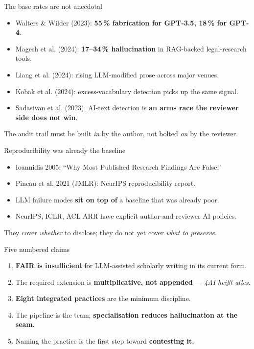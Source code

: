 \documentclass[aspectratio=169,11pt]{beamer}
\begin{document}
\begin{frame}{The base rates are not anecdotal}
  \begin{itemize}
    \item Walters \& Wilder (2023): \textbf{55\,\% fabrication for GPT-3.5, 18\,\% for GPT-4}.
    \item Magesh et al. (2024): \textbf{17--34\,\% hallucination} in RAG-backed legal-research tools.
    \item Liang et al. (2024): rising LLM-modified prose across major venues.
    \item Kobak et al. (2024): excess-vocabulary detection picks up the same signal.
    \item Sadasivan et al. (2023): AI-text detection is \textbf{an arms race the reviewer side does not win}.
  \end{itemize}

  \vspace{0.4em}
  The audit trail must be built \emph{in} by the author, not bolted \emph{on} by the reviewer.
\end{frame}

\begin{frame}{Reproducibility was already the baseline}
  \begin{itemize}
    \item Ioannidis 2005: ``Why Most Published Research Findings Are False.''
    \item Pineau et al. 2021 (JMLR): NeurIPS reproducibility report.
    \item LLM failure modes \textbf{sit on top of} a baseline that was already poor.
    \item NeurIPS, ICLR, ACL ARR have explicit author-and-reviewer AI policies.
  \end{itemize}

  \vspace{0.4em}
  They cover \emph{whether} to disclose; they do not yet cover \emph{what to preserve}.
\end{frame}


\begin{frame}{Five numbered claims}
  \begin{enumerate}
    \item \textbf{FAIR is insufficient} for LLM-assisted scholarly writing in its current form.
    \item The required extension is \textbf{multiplicative, not appended} --- \emph{4AI hei{\ss}t alles}.
    \item \textbf{Eight integrated practices} are the minimum discipline.
    \item The pipeline is the team; \textbf{specialisation reduces hallucination at the seam.}
    \item Naming the practice is the first step toward \textbf{contesting it.}
  \end{enumerate}
\end{frame}
\end{document}
